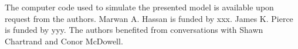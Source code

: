 \documentclass[draft]{agujournal2018}
\begin{document}

\acknowledgments
The computer code used to simulate the presented model is available upon request from the authors.
Marwan A. Hassan is funded by xxx. James K. Pierce is funded by yyy. The authors benefited from conversations with Shawn Chartrand and Conor McDowell. 


\end{document}
